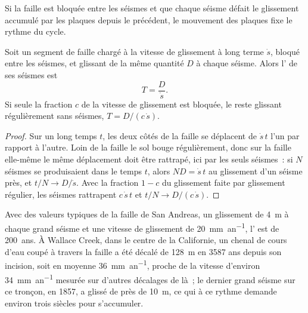 Si la faille est bloquée entre les séismes et que chaque séisme défait le
glissement accumulé par les plaques depuis le précédent, le mouvement des plaques fixe le
rythme du cycle.

\begin{proposition}\label{prop:b1:earthquake-source:recurrence}
Soit un segment de faille chargé à la vitesse de glissement à long terme $\dot s$, bloqué
entre les séismes, et glissant de la même quantité $D$ à chaque séisme. Alors
l' de ses séismes est
\[
  T = \frac{D}{\dot s} .
\]
Si seule la fraction $c$ de la vitesse de glissement est bloquée, le reste glissant
régulièrement sans séismes, $T = D/(c\,\dot s)$.
\end{proposition}

\begin{proof}
Sur un long temps $t$, les deux côtés de la faille se déplacent de $\dot s\,t$ l'un par rapport
à l'autre. Loin de la faille le sol bouge régulièrement, donc sur la faille
elle-même le même déplacement doit être rattrapé, ici par les seuls séismes~: si
$N$ séismes se produisaient dans le temps $t$, alors $N D = \dot s\,t$ au
glissement d'un séisme près, et $t/N \to D/\dot s$. Avec la fraction $1-c$ du
glissement faite par glissement régulier, les séismes rattrapent $c\,\dot s\,t$ et
$t/N \to D/(c\,\dot s)$.
\end{proof}

Avec des valeurs typiques de la faille de San Andreas, un glissement de \qty{4}{m} à chaque grand
séisme et une vitesse de glissement de \qty{20}{mm.an^{-1}}, l' est
de \qty{200}{ans}. À Wallace Creek, dans le centre de la Californie, un chenal de cours d'eau coupé
à travers la faille a été décalé de \qty{128}{m} en \num{3587} ans depuis
son incision, soit en moyenne \qty{36}{mm.an^{-1}}, proche de la vitesse d'environ
\qty{34}{mm.an^{-1}} mesurée sur d'autres décalages de là~; le dernier grand séisme
sur ce tronçon, en 1857, a glissé de près de \qty{10}{m}, ce qui à ce rythme demande
environ trois siècles pour s'accumuler.

